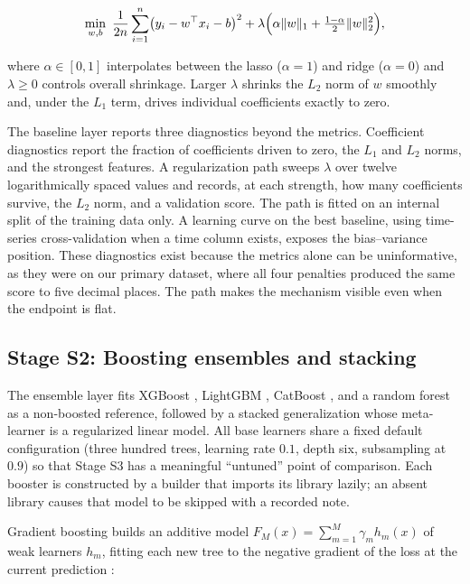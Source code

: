 \documentclass{ieeeaccess}
\begin{document}
\begin{equation}
\min_{w,b}\ \frac{1}{2n}\sum_{i=1}^{n}\bigl(y_i - w^{\top}x_i - b\bigr)^2
+ \lambda\Bigl(\alpha\lVert w\rVert_1 + \tfrac{1-\alpha}{2}\lVert w\rVert_2^2\Bigr),
\label{eq:enet}
\end{equation}

where $\alpha \in [0,1]$ interpolates between the lasso ($\alpha=1$) and ridge ($\alpha=0$) and $\lambda \ge 0$ controls overall shrinkage. Larger $\lambda$ shrinks the $L_2$ norm of $w$ smoothly and, under the $L_1$ term, drives individual coefficients exactly to zero.

The baseline layer reports three diagnostics beyond the metrics. Coefficient diagnostics report the fraction of coefficients driven to zero, the $L_1$ and $L_2$ norms, and the strongest features. A regularization path sweeps $\lambda$ over twelve logarithmically spaced values and records, at each strength, how many coefficients survive, the $L_2$ norm, and a validation score. The path is fitted on an internal split of the training data only. A learning curve on the best baseline, using time-series cross-validation when a time column exists, exposes the bias--variance position. These diagnostics exist because the metrics alone can be uninformative, as they were on our primary dataset, where all four penalties produced the same score to five decimal places. The path makes the mechanism visible even when the endpoint is flat.

\subsection{Stage S2: Boosting ensembles and stacking}
The ensemble layer fits XGBoost \cite{chen2016xgboost}, LightGBM \cite{ke2017lightgbm}, CatBoost \cite{prokhorenkova2018catboost}, and a random forest \cite{breiman2001random} as a non-boosted reference, followed by a stacked generalization \cite{wolpert1992stacked} whose meta-learner is a regularized linear model. All base learners share a fixed default configuration (three hundred trees, learning rate $0.1$, depth six, subsampling at $0.9$) so that Stage S3 has a meaningful ``untuned'' point of comparison. Each booster is constructed by a builder that imports its library lazily; an absent library causes that model to be skipped with a recorded note.

Gradient boosting builds an additive model $F_M(x)=\sum_{m=1}^{M}\gamma_m h_m(x)$ of weak learners $h_m$, fitting each new tree to the negative gradient of the loss at the current prediction \cite{friedman2001greedy}:
\end{document}
